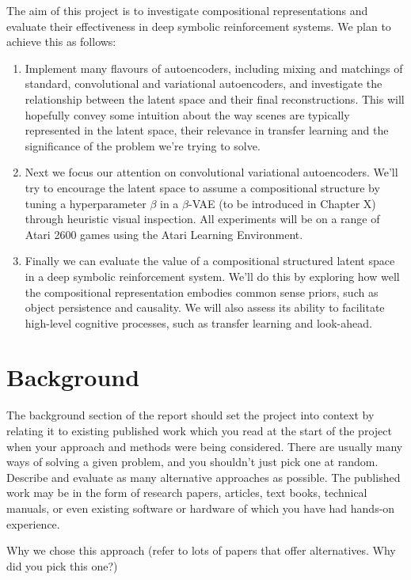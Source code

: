 \documentclass[12pt,twoside]{article}
\begin{document}
The aim of this project is to investigate compositional representations and evaluate their effectiveness in deep symbolic reinforcement systems. We plan to achieve this as follows:

\begin{enumerate}
\item Implement many flavours of autoencoders, including mixing and matchings of standard, convolutional and variational autoencoders, and investigate the relationship between the latent space and their final reconstructions. This will hopefully convey some intuition about the way scenes are typically represented in the latent space, their relevance in transfer learning and the significance of the problem we're trying to solve.
\item Next we focus our attention on convolutional variational autoencoders. We'll try to encourage the latent space to assume a compositional structure by tuning a hyperparameter $\beta$ in a $\beta$-VAE (to be introduced in Chapter X) through heuristic visual inspection. All experiments will be on a range of Atari 2600 games using the Atari Learning Environment.
\item Finally we can evaluate the value of a compositional structured latent space in a deep symbolic reinforcement system. We'll do this by exploring how well the compositional representation embodies common sense priors, such as object persistence and causality. We will also assess its ability to facilitate high-level cognitive processes, such as transfer learning and look-ahead.
\end{enumerate}

\section{Background}
The background section of the report should set the project into context by relating it to existing published work which you read at the start of the project when your approach and methods were being considered. There are usually many ways of solving a given problem, and you shouldn't just pick one at random. Describe and evaluate as many alternative approaches as possible. The published work may be in the form of research papers, articles, text books, technical manuals, or even existing software or hardware of which you have had hands-on experience.

Why we chose this approach (refer to lots of papers that offer alternatives. Why did you pick this one?)\\
\end{document}

